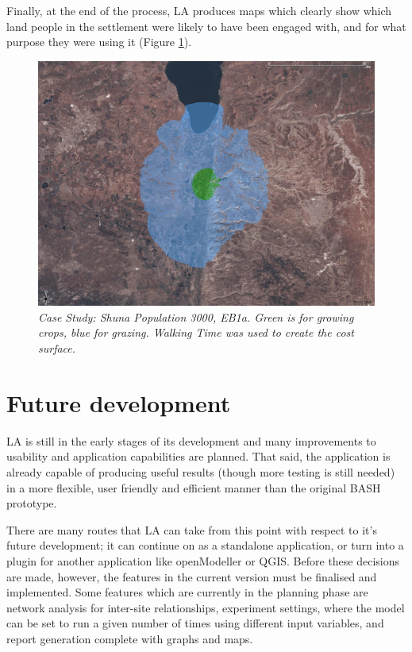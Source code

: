   Finally, at the end of the process, LA produces maps which clearly show
  which land people in the settlement were likely to have been engaged with, and
  for what purpose they were using it (Figure \ref{fig:caseStudy}).
\begin{figure}[htbp] %
  \includegraphics[scale=0.22]{./images/LEB130007030FallowSlope.jpg}
  \caption{\label{fig:caseStudy}\textit{Case Study: Shuna  Population 3000, EB1a. 
    Green is for growing crops, blue for grazing.  Walking Time was used to
    create the cost surface.}}
\end{figure}
\section{Future development} \label{FuturePlans} 
  LA is still in the early stages of its development and many
  improvements to usability and application capabilities are planned. That said,
  the application is already capable of producing useful results (though more
  testing is still needed) in a more flexible, user friendly and efficient
  manner than the original BASH prototype.

  There are many routes that LA can take from this point with
  respect to it's future development; it can continue on as a standalone
  application, or turn into a plugin for another application like openModeller
  or QGIS.  Before these decisions are made, however, the features in the current
  version must be finalised and implemented.  Some features which are currently
  in the planning phase are network analysis  for inter-site relationships,
  experiment settings, where the model can be set to run a given number of times
  using different input variables, and report generation complete with graphs
  and maps. 

